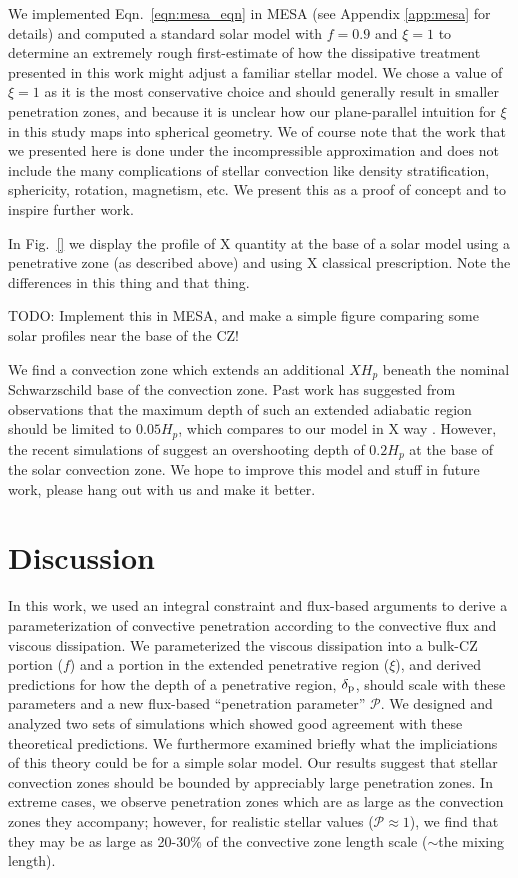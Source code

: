 \documentclass[twocolumn]{aastex631}
\newcommand{\delp}{\ensuremath{\delta_{\rm{p}}}}
\newcommand{\mP}{\ensuremath{\mathcal{P}}}
\begin{document}
We implemented Eqn.~\ref{eqn:mesa_eqn} in MESA (see Appendix \ref{app:mesa} for details) and computed a standard solar model with $f = 0.9$ and $\xi = 1$ to determine an extremely rough first-estimate of how the dissipative treatment presented in this work might adjust a familiar stellar model.
We chose a value of $\xi = 1$ as it is the most conservative choice and should generally result in smaller penetration zones, and because it is unclear how our plane-parallel intuition for $\xi$ in this study maps into spherical geometry.
We of course note that the work that we presented here is done under the incompressible approximation and does not include the many complications of stellar convection like density stratification, sphericity, rotation, magnetism, etc.
We present this as a proof of concept and to inspire further work.

In Fig.~\ref{} we display the profile of X quantity at the base of a solar model using a penetrative zone (as described above) and using X classical prescription.
Note the differences in this thing and that thing.

TODO: Implement this in MESA, and make a simple figure comparing some solar profiles near the base of the CZ!

We find a convection zone which extends an additional $X H_p$ beneath the nominal Schwarzschild base of the convection zone.
Past work has suggested from observations that the maximum depth of such an extended adiabatic region should be limited to $0.05 H_p$, which compares to our model in X way \citep[see e.g., section 7.2.1 of][]{basu2016}.
However, the recent simulations of \citet{kapyla2019} suggest an overshooting depth of $0.2 H_p$ at the base of the solar convection zone.
We hope to improve this model and stuff in future work, please hang out with us and make it better.


\section{Discussion}
\label{sec:discussion}
In this work, we used an integral constraint \citep[reminiscent of][]{roxburgh1989} and flux-based arguments \citep[similar to][]{zahn1991} to derive a parameterization of convective penetration according to the convective flux and viscous dissipation.
We parameterized the viscous dissipation into a bulk-CZ portion ($f$) and a portion in the extended penetrative region ($\xi$), and derived predictions for how the depth of a penetrative region, $\delp$, should scale with these parameters and a new flux-based ``penetration parameter'' $\mP$.
We designed and analyzed two sets of simulations which showed good agreement with these theoretical predictions.
We furthermore examined briefly what the impliciations of this theory could be for a simple solar model.
Our results suggest that stellar convection zones should be bounded by appreciably large penetration zones.
In extreme cases, we observe penetration zones which are as large as the convection zones they accompany; however, for realistic stellar values ($\mP \approx 1$), we find that they may be as large as 20-30\% of the convective zone length scale ($\sim$the mixing length).
\end{document}
